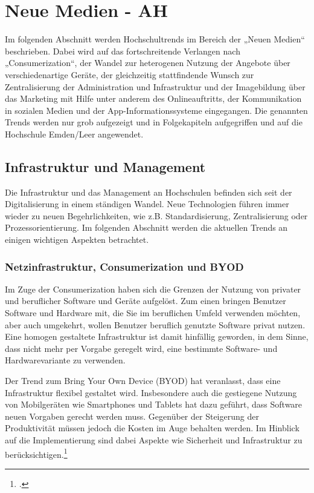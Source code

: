 \section{Neue Medien - AH}

Im folgenden Abschnitt werden Hochschultrends im Bereich der „Neuen Medien“ beschrieben. Dabei wird auf das fortschreitende Verlangen nach „Consumerization“, der Wandel zur heterogenen Nutzung der Angebote über verschiedenartige Geräte, der gleichzeitig stattfindende Wunsch zur Zentralisierung der Administration und Infrastruktur und der Imagebildung über das Marketing mit Hilfe unter anderem des Onlineauftritts, der Kommunikation in sozialen Medien und der App-Informationssysteme eingegangen. Die genannten Trends werden nur grob aufgezeigt und in Folgekapiteln aufgegriffen und auf die Hochschule Emden/Leer angewendet.


\subsection{Infrastruktur und Management}
Die Infrastruktur und das Management an Hochschulen befinden sich seit der Digitalisierung in einem ständigen Wandel. Neue Technologien führen immer wieder zu neuen Begehrlichkeiten, wie z.B. Standardisierung, Zentralisierung oder Prozessorientierung. Im folgenden Abschnitt werden die aktuellen Trends an einigen wichtigen Aspekten betrachtet.


\subsubsection{Netzinfrastruktur, Consumerization und BYOD}
\label{netzinfrastruktur_consumerization_und_byod}
Im Zuge der Consumerization haben sich die Grenzen der Nutzung von privater und beruflicher Software und Geräte aufgelöst. Zum einen bringen Benutzer Software und Hardware mit, die Sie im beruflichen Umfeld verwenden möchten, aber auch umgekehrt, wollen Benutzer beruflich genutzte Software privat nutzen. Eine homogen gestaltete Infrastruktur ist damit hinfällig geworden, in dem Sinne, dass nicht mehr per Vorgabe geregelt wird, eine bestimmte Software- und Hardwarevariante zu verwenden.

Der Trend zum Bring Your Own Device (BYOD) hat veranlasst, dass eine Infrastruktur flexibel 
gestaltet wird. Insbesondere auch die gestiegene Nutzung von Mobilgeräten wie Smartphones 
und Tablets hat dazu geführt, dass Software neuen Vorgaben gerecht werden muss. Gegenüber 
der Steigerung der Produktivität müssen jedoch die Kosten im Auge behalten werden. Im 
Hinblick auf die Implementierung sind dabei Aspekte wie Sicherheit und Infrastruktur zu 
berücksichtigen.\footcite{forrester_research_2012}

